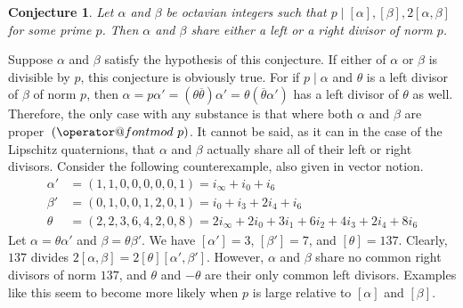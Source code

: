 \documentclass[10pt]{amsart}
\makeatletter
\renewcommand{\bar}{\overline}
\newcommand{\norm}[1]{\left[#1\right]}
\newtheorem{conj}[thm]{Conjecture}
\DeclareRobustCommand{\pmod}{\@pmods}
\def\@pmods#1{\mkern4mu({\operator@font mod}\mkern 6mu#1)}
\makeatother
\begin{document}
\begin{conj}
\normalfont
Let $\alpha$ and $\beta$ be octavian integers such that $p \mid \norm{\alpha}, \norm{\beta}, 2\norm{\alpha, \beta}$ for some prime $p$.  Then $\alpha$ and $\beta$ share either a left or a right divisor of norm $p$.
\end{conj}
Suppose $\alpha$ and $\beta$ satisfy the hypothesis of this conjecture.  If either of $\alpha$ or $\beta$ is divisible by $p$, this conjecture is obviously true.  For if $p \mid \alpha$ and $\theta$ is a left divisor of $\beta$ of norm $p$, then $\alpha = p\alpha' = (\theta \bar{\theta})\alpha' = \theta(\bar{\theta}\alpha')$ has a left divisor of $\theta$ as well.  Therefore, the only case with any substance is that where both $\alpha$ and $\beta$ are proper $\pmod{p}$.  It cannot be said, as it can in the case of the Lipschitz quaternions, that $\alpha$ and $\beta$ actually share all of their left or right divisors.  Consider the following counterexample, also given in vector notion.
\begin{align*}
\alpha' &= (1,1,0,0,0,0,0,1) = i_\infty + i_0 + i_6 \\
\beta'  &= (0,1,0,0,1,2,0,1) = i_0 + i_3 + 2i_4 + i_6 \\
\theta  &= (2,2,3,6,4,2,0,8) = 2i_\infty + 2i_0 + 3i_1 + 6i_2 + 4i_3 + 2i_4 + 8i_6
\end{align*}
Let $\alpha = \theta \alpha'$ and $\beta = \theta\beta'$.  We have $\norm{\alpha'} = 3$, $\norm{\beta'} = 7$, and $\norm{\theta} = 137$.  Clearly, $137$ divides $2\norm{\alpha,\beta} = 2\norm{\theta}\norm{\alpha',\beta'}$.  However, $\alpha$ and $\beta$ share no common right divisors of norm $137$, and $\theta$ and $-\theta$ are their only common left divisors.  Examples like this seem to become more likely when $p$ is large relative to $\norm{\alpha}$ and $\norm{\beta}$.

\vspace{7cm}

















\pagebreak
\end{document}
